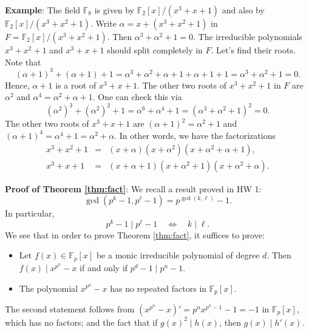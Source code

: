 \documentclass{article}
\def\F{{\mathbb F}}
\def\F{{\mathbb F}}
\begin{document}
\vspace{5pt}
\noindent\textbf{Example}: The field $\F_8$ is given by $\F_2[x]/(x^3 + x + 1)$ and also by $\F_2[x]/(x^3 + x^2 + 1)$. Write $\alpha = x + (x^3 + x^2 + 1)$ in $F = \F_2[x]/(x^3 + x^2 + 1)$. Then $\alpha^3 + \alpha^2 + 1 = 0$. The irreducible polynomials $x^3 + x^2 + 1$ and $x^3 + x + 1$ should split completely in $F$. Let's find their roots.
  Note that
$$(\alpha+1)^3 + (\alpha+1) + 1 = \alpha^3 + \alpha^2 + \alpha + 1 + \alpha + 1 + 1 = \alpha^3 + \alpha^2 + 1 = 0.$$
Hence, $\alpha+1$ is a root of $x^3 + x + 1$. The other two roots of $x^3 + x^2 + 1$ in $F$ are $\alpha^2$ and $\alpha^4 = \alpha^2 + \alpha + 1$. One can check this via
$$(\alpha^2)^3 + (\alpha^2)^2 + 1 = \alpha^6 + \alpha^4 + 1 = (\alpha^3 + \alpha^2 + 1)^2 = 0.$$
The other two roots of $x^3 + x + 1$ are $(\alpha+1)^2 = \alpha^2 + 1$ and $(\alpha+1)^4 = \alpha^4 + 1 = \alpha^2 + \alpha$. In other words, we have the factorizations
\begin{eqnarray*}
    x^3 + x^2 + 1 &=& (x + \alpha)(x + \alpha^2)(x + \alpha^2 + \alpha + 1),\\
    x^3 + x + 1 &=& (x + \alpha + 1)(x + \alpha^2 + 1)(x + \alpha^2 + \alpha).
\end{eqnarray*}

\begin{comment}
We make a very important observation. From the binomial expansion, we have
$$(a + b)^{p^n} = \sum_{r = 0}^{p^n}\binom{p^n}{r}a^rb^{p^n - r}.$$
Moreover, we know that $$\nu_p\Big(\binom{p^n}{r}\Big) = n - \nu_p(r) > 0 \qquad\mbox{if}\qquad 0 < r < p^n$$ by Corollary \ref{cor:ndivp}. In other words, all the middle coefficients are divisible by $p$. Therefore, if we are in characteristic $p$, then
$$(a + b)^{p^n} = a^{p^n} + b^{p^n}.$$
In particular, if $f(x) = a_mx^m + \cdots + a_0 \in \F_{p^n}[x]$, then each $a_i^{p^n} = a_i$ and
$$f(x)^{p^n} = a_m^{p^n}x^{mp^n} + \cdots + a_0^{p^n} = a_m(x^{p^n})^m + \cdots + a_0 = f(x^{p^n}).$$
\end{comment}



\noindent\textbf{Proof of Theorem \ref{thm:fact}}: We recall a result proved in HW 1:
$$\gcd(p^k - 1, p^\ell - 1) = p^{\gcd(k,\ell)} - 1.$$
In particular, $$p^k - 1\mid p^\ell - 1\quad\Longleftrightarrow\quad k\mid\ell.$$
We see that in order to prove Theorem \ref{thm:fact}, it suffices to prove:
\begin{itemize}
    \item Let $f(x)\in\F_p[x]$ be a monic irreducible polynomial of degree $d$. Then $f(x)\mid x^{p^n}-x$ if and only if $p^d - 1 \mid p^n - 1$.
    \item The polynomial $x^{p^n} - x$ has no repeated factors in $\F_p[x]$.
\end{itemize}
The second statement follows from $(x^{p^n} - x)' = p^nx^{p^n-1}-1 = -1$ in $\F_p[x]$, which has no factors; and the fact that if $g(x)^2\mid h(x)$, then $g(x)\mid h'(x)$.
\end{document}
